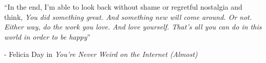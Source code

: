 \chapter*{}


``In the end, I'm able to look back without shame or regretful nostalgia and think, \textit{You did something great. And something new will come around. Or not. Either way, do the work you love. And love yourself. That's all you can do in this world in order to be happy}'' 

- Felicia Day in \textit{You're Never Weird on the Internet (Almost)}